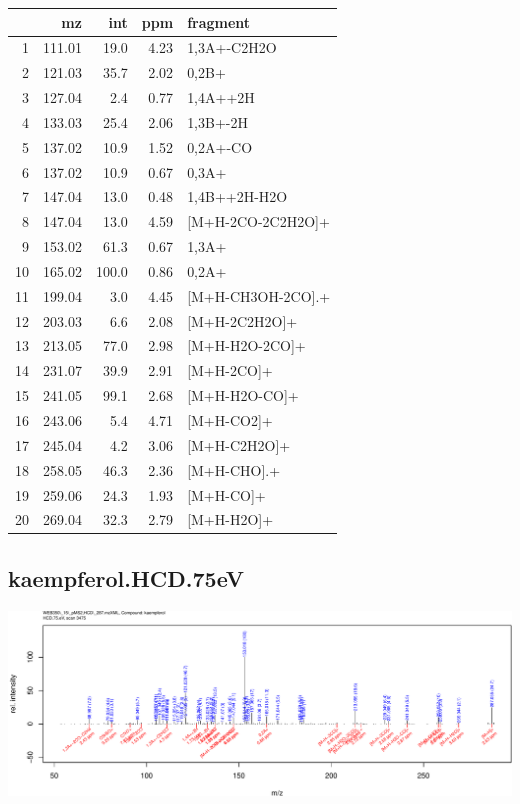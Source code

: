 \documentclass[]{article}
\begin{document}
\begin{table}[ht]
\centering
\begin{tabular}{rrrrl}
  \toprule
 & mz & int & ppm & fragment \\ 
  \midrule
1 & 111.01 & 19.0 & 4.23 & 1,3A+-C2H2O \\ 
  2 & 121.03 & 35.7 & 2.02 & 0,2B+ \\ 
  3 & 127.04 & 2.4 & 0.77 & 1,4A++2H \\ 
  4 & 133.03 & 25.4 & 2.06 & 1,3B+-2H \\ 
  5 & 137.02 & 10.9 & 1.52 & 0,2A+-CO \\ 
  6 & 137.02 & 10.9 & 0.67 & 0,3A+ \\ 
  7 & 147.04 & 13.0 & 0.48 & 1,4B++2H-H2O \\ 
  8 & 147.04 & 13.0 & 4.59 & [M+H-2CO-2C2H2O]+ \\ 
  9 & 153.02 & 61.3 & 0.67 & 1,3A+ \\ 
  10 & 165.02 & 100.0 & 0.86 & 0,2A+ \\ 
  11 & 199.04 & 3.0 & 4.45 & [M+H-CH3OH-2CO].+ \\ 
  12 & 203.03 & 6.6 & 2.08 & [M+H-2C2H2O]+ \\ 
  13 & 213.05 & 77.0 & 2.98 & [M+H-H2O-2CO]+ \\ 
  14 & 231.07 & 39.9 & 2.91 & [M+H-2CO]+ \\ 
  15 & 241.05 & 99.1 & 2.68 & [M+H-H2O-CO]+ \\ 
  16 & 243.06 & 5.4 & 4.71 & [M+H-CO2]+ \\ 
  17 & 245.04 & 4.2 & 3.06 & [M+H-C2H2O]+ \\ 
  18 & 258.05 & 46.3 & 2.36 & [M+H-CHO].+ \\ 
  19 & 259.06 & 24.3 & 1.93 & [M+H-CO]+ \\ 
  20 & 269.04 & 32.3 & 2.79 & [M+H-H2O]+ \\ 
   \bottomrule
\end{tabular}
\end{table}

\clearpage\subsection{kaempferol.HCD.75eV}
\includegraphics[width=\textwidth]{WEB350_files/figure-latex/unnamed-chunk-3-26}
\end{document}
